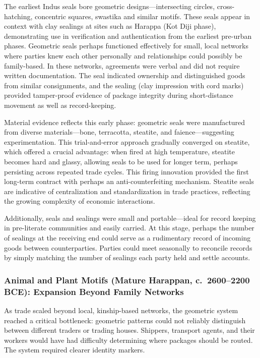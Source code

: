 \documentclass[12pt]{article}
\begin{document}
The earliest Indus seals bore geometric designs—intersecting circles,
cross-hatching, concentric squares, swastika and similar motifs. These seals
appear in context with clay sealings at sites such as Harappa (Kot Diji phase),
demonstrating use in verification and authentication from the earliest pre-urban
phases.  Geometric seals perhaps functioned effectively for small, local networks
where parties knew each other personally and relationships could possibly be
family-based. In these networks, agreements were verbal and did not require
written documentation. The seal indicated ownership and distinguished goods
from similar consignments, and the sealing (clay impression with cord marks)
provided tamper-proof evidence of package integrity during short-distance
movement as well as record-keeping.

Material evidence reflects this early phase: geometric seals were manufactured from
diverse materials—bone, terracotta, steatite, and faience—suggesting experimentation.
This trial-and-error approach gradually converged on steatite, which offered a crucial
advantage: when fired at high temperature, steatite becomes hard and glassy, allowing
seals to be used for longer term, perhaps persisting across repeated trade cycles.
This firing innovation provided the first long-term contract with perhaps an
anti-counterfeiting mechanism. Steatite seals are indicative of centralization
and standardization in trade practices, reflecting the growing complexity of economic
interactions.

Additionally, seals and sealings were small and portable---ideal for record
keeping in pre-literate communities and easily carried. At this stage, perhaps
the number of sealings at the receiving end could serve as a rudimentary record
of incoming goods between counterparties.  Parties could meet seasonally to
reconcile records by simply matching the number of sealings each party held
and settle accounts.

\subsubsection{Animal and Plant Motifs (Mature Harappan, c.\ 2600--2200 BCE): Expansion Beyond Family Networks}

As trade scaled beyond local, kinship-based networks, the geometric system reached a
critical bottleneck: geometric patterns could not reliably distinguish between different
traders or trading houses. Shippers, transport agents, and their workers would
have had difficulty determining where packages should be routed. The system
required clearer identity markers.
\end{document}
